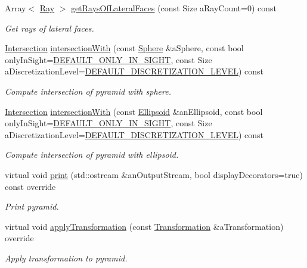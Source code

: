 \begin{DoxyCompactItemize}
Array$<$ \hyperlink{classostk_1_1math_1_1geom_1_1d3_1_1objects_1_1_ray}{Ray} $>$ \hyperlink{classostk_1_1math_1_1geom_1_1d3_1_1objects_1_1_pyramid_a7ead70ef5dff894a705f337dbc6cbff6}{get\+Rays\+Of\+Lateral\+Faces} (const Size a\+Ray\+Count=0) const
\begin{DoxyCompactList}\small\item\em Get rays of lateral faces. \end{DoxyCompactList}\item 
\hyperlink{classostk_1_1math_1_1geom_1_1d3_1_1_intersection}{Intersection} \hyperlink{classostk_1_1math_1_1geom_1_1d3_1_1objects_1_1_pyramid_a254b6d83bb83794852fe13317728ddf0}{intersection\+With} (const \hyperlink{classostk_1_1math_1_1geom_1_1d3_1_1objects_1_1_sphere}{Sphere} \&a\+Sphere, const bool only\+In\+Sight=\hyperlink{_sphere_8hpp_af424617f7c785f4835e2feba5a5640f2}{D\+E\+F\+A\+U\+L\+T\+\_\+\+O\+N\+L\+Y\+\_\+\+I\+N\+\_\+\+S\+I\+G\+HT}, const Size a\+Discretization\+Level=\hyperlink{_pyramid_8hpp_a3eb9931e85ba4c9718113211e549e91d}{D\+E\+F\+A\+U\+L\+T\+\_\+\+D\+I\+S\+C\+R\+E\+T\+I\+Z\+A\+T\+I\+O\+N\+\_\+\+L\+E\+V\+EL}) const
\begin{DoxyCompactList}\small\item\em Compute intersection of pyramid with sphere. \end{DoxyCompactList}\item 
\hyperlink{classostk_1_1math_1_1geom_1_1d3_1_1_intersection}{Intersection} \hyperlink{classostk_1_1math_1_1geom_1_1d3_1_1objects_1_1_pyramid_aedc018303c7b9788036bc9269fcc161f}{intersection\+With} (const \hyperlink{classostk_1_1math_1_1geom_1_1d3_1_1objects_1_1_ellipsoid}{Ellipsoid} \&an\+Ellipsoid, const bool only\+In\+Sight=\hyperlink{_sphere_8hpp_af424617f7c785f4835e2feba5a5640f2}{D\+E\+F\+A\+U\+L\+T\+\_\+\+O\+N\+L\+Y\+\_\+\+I\+N\+\_\+\+S\+I\+G\+HT}, const Size a\+Discretization\+Level=\hyperlink{_pyramid_8hpp_a3eb9931e85ba4c9718113211e549e91d}{D\+E\+F\+A\+U\+L\+T\+\_\+\+D\+I\+S\+C\+R\+E\+T\+I\+Z\+A\+T\+I\+O\+N\+\_\+\+L\+E\+V\+EL}) const
\begin{DoxyCompactList}\small\item\em Compute intersection of pyramid with ellipsoid. \end{DoxyCompactList}\item 
virtual void \hyperlink{classostk_1_1math_1_1geom_1_1d3_1_1objects_1_1_pyramid_ae308eee53a721c8c41463a1ec4842a2d}{print} (std\+::ostream \&an\+Output\+Stream, bool display\+Decorators=true) const override
\begin{DoxyCompactList}\small\item\em Print pyramid. \end{DoxyCompactList}\item 
virtual void \hyperlink{classostk_1_1math_1_1geom_1_1d3_1_1objects_1_1_pyramid_ab4f31049019c0ea4b87931adf4ba7c5d}{apply\+Transformation} (const \hyperlink{classostk_1_1math_1_1geom_1_1d3_1_1_transformation}{Transformation} \&a\+Transformation) override
\begin{DoxyCompactList}\small\item\em Apply transformation to pyramid. \end{DoxyCompactList}\end{DoxyCompactItemize}

